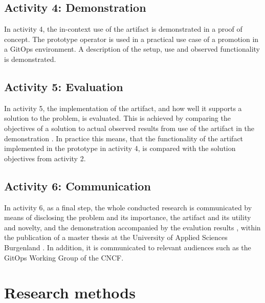 \subsection{Activity 4: Demonstration}
\label{methodology:activity4}

\noindent
In activity 4,
the in-context use of the artifact is demonstrated in a proof of concept.
The prototype operator is used in a practical use case of a promotion in a GitOps environment.
A description of the setup, use and observed functionality is demonstrated.
%
\bigskip

\subsection{Activity 5: Evaluation}
\label{methodology:activity5}

\noindent
In activity 5,
the implementation of the artifact,
and how well it supports a solution to the problem,
is evaluated.
This is achieved by
comparing the objectives of a solution to actual observed results
from use of the artifact in the demonstration
\autocite{designScienceResearchMethodologyForInformationSystemsResearch}.
In practice this means, that
the functionality of the artifact implemented in the prototype in activity 4,
is compared with the solution objectives from activity 2.
\bigskip

\subsection{Activity 6: Communication}
\label{methodology:activity6}

\noindent
In activity 6, as a final step,
the whole conducted research is communicated by means of
disclosing
the problem and its importance,
the artifact and its utility and novelty,
and the demonstration accompanied by the evalution results
\autocite{designScienceResearchMethodologyForInformationSystemsResearch},
within the publication of a master thesis at
the University of Applied Sciences Burgenland \autocite{fhBurgenlandWebsite}.
In addition, it is communicated to relevant audiences such as
the GitOps Working Group \autocite{gitopsWG} of the CNCF.






\section{Research methods}

